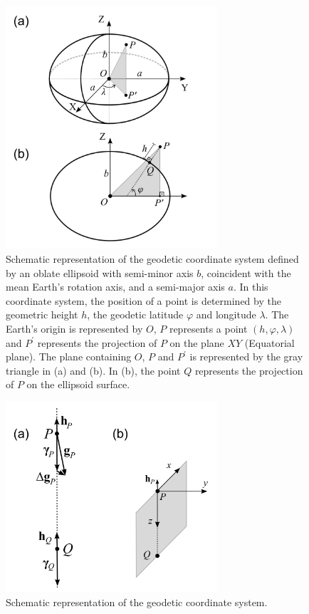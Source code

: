 \documentclass[manuscript]{geophysics}
\begin{document}

\begin{figure}
    \centering
    \includegraphics[width=0.7\textwidth]{figures/geodetic_coordinates.png}
    \caption{Schematic representation of the geodetic coordinate
    system defined by an oblate ellipsoid with semi-minor axis $b$, 
    coincident with the mean Earth's rotation axis, and a semi-major
    axis $a$. In this coordinate system, the position of a point is
    determined by the geometric height $h$, the geodetic latitude 
    $\varphi$ and longitude $\lambda$. The Earth's origin is represented 
    by $O$, $P$ represents a point $(h, \varphi, \lambda)$ and 
    $P^{\prime}$ represents the projection of $P$ on the plane $XY$ 
    (Equatorial plane). The plane containing $O$, $P$ and 
    $P^{\prime}$ is represented by the gray triangle in (a) and (b). 
    In (b), the point $Q$ represents the projection of $P$ on the 
    ellipsoid surface.}
  \label{fig:fig1}
\end{figure}

\begin{figure}
    \centering
    \includegraphics[width=0.7\textwidth]{figures/gravitational_disturbance.png}
    \caption{Schematic representation of the geodetic coordinate
    system.}
  \label{fig:fig2}
\end{figure}
\end{document}
